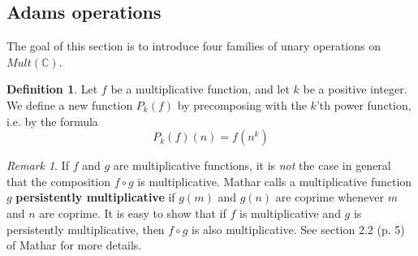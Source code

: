 \documentclass[a4paper]{article}
\theoremstyle{definition}
\newtheorem{definition}{Definition}[section]
\theoremstyle{remark}
\newtheorem*{remark}{Remark}
\newcommand{\defhl}[1]{\textbf{#1}}
\begin{document}
\subsection{Adams operations}

The goal of this section is to introduce four families of unary operations on $Mult(\mathbb{C})$.








\begin{definition}
Let $f$ be a multiplicative function, and let $k$ be a positive integer. We define a new function $P_k(f)$ by precomposing with the $k$'th power function, i.e. by the formula
$$ P_k(f)(n) = f(n^k)   $$
\end{definition}

\begin{remark}
If $f$ and $g$ are multiplicative functions, it is \emph{not} the case in general that the composition $f \circ g$ is multiplicative. Mathar calls a multiplicative function $g$ \defhl{persistently multiplicative} if $g(m)$ and $g(n)$ are coprime whenever $m$ and $n$ are coprime. It is easy to show that if $f$ is multiplicative and $g$ is persistently multiplicative, then $f \circ g$ is also multiplicative. See section 2.2 (p. 5) of Mathar for more details.
\end{remark}
\end{document}
